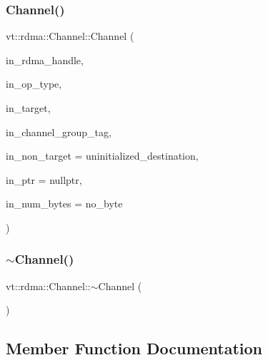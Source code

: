 \subsubsection{\texorpdfstring{Channel()}{Channel()}}
{\footnotesize\ttfamily vt\+::rdma\+::\+Channel\+::\+Channel (\begin{DoxyParamCaption}\item[{\hyperlink{namespacevt_a10442579ec4e7ebef223818e64bcf908}{R\+D\+M\+A\+\_\+\+Handle\+Type} const \&}]{in\+\_\+rdma\+\_\+handle,  }\item[{\hyperlink{namespacevt_1_1rdma_ac848e1d9da43db6294bd06f83e5d3946}{R\+D\+M\+A\+\_\+\+Type\+Type} const \&}]{in\+\_\+op\+\_\+type,  }\item[{\hyperlink{namespacevt_a866da9d0efc19c0a1ce79e9e492f47e2}{Node\+Type} const \&}]{in\+\_\+target,  }\item[{\hyperlink{namespacevt_a84ab281dae04a52a4b243d6bf62d0e52}{Tag\+Type} const \&}]{in\+\_\+channel\+\_\+group\+\_\+tag,  }\item[{\hyperlink{namespacevt_a866da9d0efc19c0a1ce79e9e492f47e2}{Node\+Type} const \&}]{in\+\_\+non\+\_\+target = {\ttfamily uninitialized\+\_\+destination},  }\item[{\hyperlink{namespacevt_aab05b4a584f7ee835a6d0f66915cf59b}{R\+D\+M\+A\+\_\+\+Ptr\+Type} const \&}]{in\+\_\+ptr = {\ttfamily nullptr},  }\item[{\hyperlink{namespacevt_aab8d55968084610ce3b17057981e9300}{Byte\+Type} const \&}]{in\+\_\+num\+\_\+bytes = {\ttfamily no\+\_\+byte} }\end{DoxyParamCaption})}

\mbox{\label{structvt_1_1rdma_1_1_channel_a4e32f293df8c7d988a080065647c4253}} 
\subsubsection{\texorpdfstring{$\sim$\+Channel()}{~Channel()}}
{\footnotesize\ttfamily vt\+::rdma\+::\+Channel\+::$\sim$\+Channel (\begin{DoxyParamCaption}{ }\end{DoxyParamCaption})\hspace{0.3cm}{\ttfamily [virtual]}}



\subsection{Member Function Documentation}
\mbox{\label{structvt_1_1rdma_1_1_channel_a0e68ef1830979531a430f2a9b0206afb}} 
